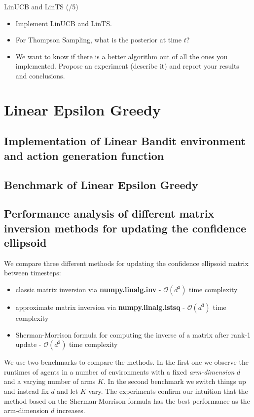 \begin{problem}{LinUCB and LinTS (/5)}{}
\begin{itemize}
    \item Implement LinUCB and LinTS. 
    \item For Thompson Sampling, what is the posterior at time $t$?
    \item We want to know if there is a better algorithm out of all the ones you implemented. Propose an experiment (describe it) and report your results and conclusions.
\end{itemize}
\end{problem}

\section{Linear Epsilon Greedy}
\subsection{Implementation of Linear Bandit environment and action generation function}
\subsection{Benchmark of Linear Epsilon Greedy}
\subsection{Performance analysis of different matrix inversion methods for updating the confidence ellipsoid}
We compare three different methods for updating the confidence ellipsoid matrix between timesteps:
\begin{itemize}
  \item classic matrix inversion via \textbf{numpy.linalg.inv} - $\mathcal{O}(d^3)$ time complexity
  \item approximate matrix inversion via \textbf{numpy.linalg.lstsq} - $\mathcal{O}(d^3)$ time complexity
  \item Sherman-Morrison formula for computing the inverse of a matrix after rank-1 update - $\mathcal{O}(d^2)$ time complexity
\end{itemize}
We use two benchmarks to compare the methods. In the first one we observe the runtimes of agents in a number of environments
with a fixed \textit{arm-dimension} $d$ and a varying number of arms $K$. In the second benchmark we switch things up and instead fix $d$
and let $K$ vary. The experiments confirm our intuition that the method based on the Sherman-Morrison formula has the best performance as the
arm-dimension $d$ increases.

